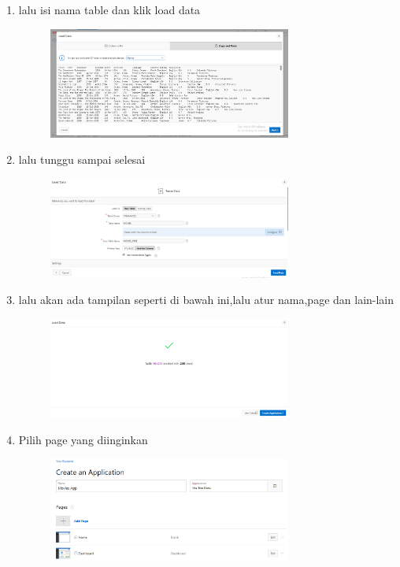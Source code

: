 \documentclass{article}
\begin{document}
\begin{enumerate}
\begin{figure}[h]
            \end{figure}
           \newpage \item lalu isi nama table dan klik load data
\begin{figure}[h]
\centerline{\includegraphics[width=8cm]{figure/12.png}}
            \end{figure}
            \item lalu tunggu sampai selesai
\begin{figure}[h]
\centerline{\includegraphics[width=8cm]{figure/13.png}}
            \end{figure}
            \item lalu akan ada tampilan seperti di bawah ini,lalu atur nama,page dan lain-lain
\begin{figure}[h]
\centerline{\includegraphics[width=8cm]{figure/14.png}}
            \end{figure}
           \newpage \item Pilih page yang diinginkan
\begin{figure}[h]
\centerline{\includegraphics[width=8cm]{figure/15.png}}

\end{figure}
\end{enumerate}
\end{document}

